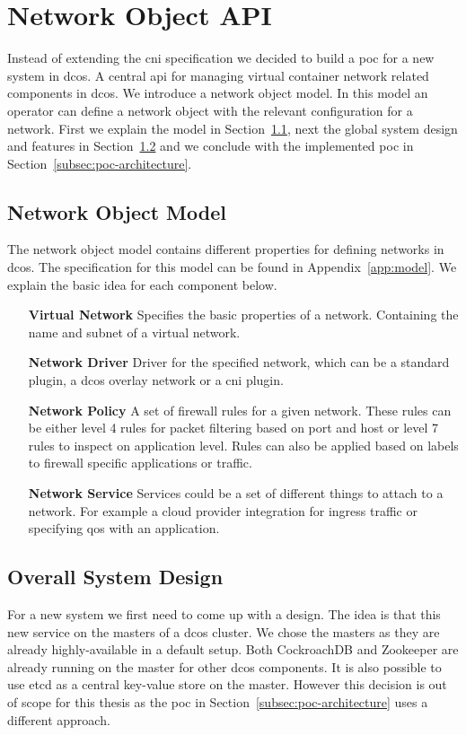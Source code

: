 \section{Network Object API}
\label{sec:networkobject-api}
Instead of extending the \gls{cni} specification we decided to build a \gls{poc} for a new system in \gls{dcos}. A central \gls{api} for managing virtual container network related components in \gls{dcos}. We introduce a network object model. In this model an operator can define a network object with the relevant configuration for a network. First we explain the model in Section~\ref{subsec:network-object-model}, next the global system design and features in Section~\ref{subsec:system-design} and we conclude with the implemented \gls{poc} in Section~\ref{subsec:poc-architecture}.

\subsection{Network Object Model}
\label{subsec:network-object-model}
The network object model contains different properties for defining networks in \gls{dcos}. The specification for this model can be found in Appendix~\ref{app:model}. We explain the basic idea for each component below.
\begin{itemize}
    \item[\textbf{Virtual Network}] Specifies the basic properties of a network. Containing the name and subnet of a virtual network.
    \item[\textbf{Network Driver}] Driver for the specified network, which can be a standard plugin, a \gls{dcos} overlay network or a \gls{cni} plugin.
    \item[\textbf{Network Policy}] A set of firewall rules for a given network. These rules can be either level 4 rules for packet filtering based on port and host or level 7 rules to inspect on application level. Rules can also be applied based on labels to firewall specific applications or traffic.
    \item[\textbf{Network Service}] Services could be a set of different things to attach to a network. For example a cloud provider integration for ingress traffic or specifying \gls{qos} with an application.
\end{itemize}

\subsection{Overall System Design}
\label{subsec:system-design}
For a new system we first need to come up with a design. The idea is that this new service on the masters of a \gls{dcos} cluster. We chose the masters as they are already highly-available in a default setup. Both CockroachDB\cite{cockroachdb} and Zookeeper\cite{zookeeper} are already running on the master for other \gls{dcos} components. It is also possible to use etcd\cite{etcd} as a central key-value store on the master. However this decision is out of scope for this thesis as the \gls{poc} in Section~\ref{subsec:poc-architecture} uses a different approach.

